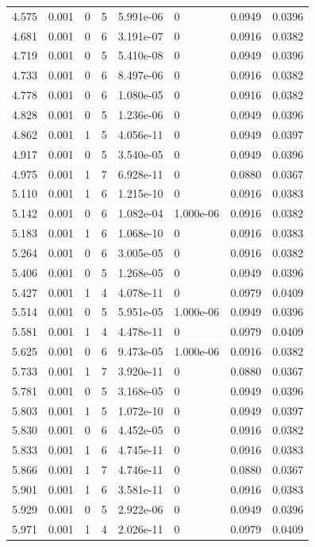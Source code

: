 \documentclass[preview]{standalone}
\begin{document}
{{{\begin{tabular}{L{1.2cm}C{1.2cm} C{0.3cm}C{0.5cm} C{1.4cm}C{1.4cm} C{1.4cm}C{1.4cm}}
  4.575  &  0.001  & 0     &  5 &  5.991e-06  & 0  & 0.0949 &  0.0396   \\ 
  4.681  &  0.001  & 0     &  6 &  3.191e-07  & 0  & 0.0916 &  0.0382   \\ 
  4.719  &  0.001  & 0     &  5 &  5.410e-08  & 0  & 0.0949 &  0.0396   \\ 
  4.733  &  0.001  & 0     &  6 &  8.497e-06  & 0  & 0.0916 &  0.0382   \\ 
  4.778  &  0.001  & 0     &  6 &  1.080e-05  & 0  & 0.0916 &  0.0382   \\ 
  4.828  &  0.001  & 0     &  5 &  1.236e-06  & 0  & 0.0949 &  0.0396   \\ 
  4.862  &  0.001  & 1     &  5 &  4.056e-11  & 0  & 0.0949 &  0.0397   \\ 
  4.917  &  0.001  & 0     &  5 &  3.540e-05  & 0  & 0.0949 &  0.0396   \\ 
  4.975  &  0.001  & 1     &  7 &  6.928e-11  & 0  & 0.0880 &  0.0367   \\ 
  5.110  &  0.001  & 1     &  6 &  1.215e-10  & 0  & 0.0916 &  0.0383   \\ 
  5.142  &  0.001  & 0     &  6 &  1.082e-04  & 1.000e-06  & 0.0916 &  0.0382   \\ 
  5.183  &  0.001  & 1     &  6 &  1.068e-10  & 0  & 0.0916 &  0.0383   \\ 
  5.264  &  0.001  & 0     &  6 &  3.005e-05  & 0  & 0.0916 &  0.0382   \\ 
  5.406  &  0.001  & 0     &  5 &  1.268e-05  & 0  & 0.0949 &  0.0396   \\ 
  5.427  &  0.001  & 1     &  4 &  4.078e-11  & 0  & 0.0979 &  0.0409   \\ 
  5.514  &  0.001  & 0     &  5 &  5.951e-05  & 1.000e-06  & 0.0949 &  0.0396   \\ 
  5.581  &  0.001  & 1     &  4 &  4.478e-11  & 0  & 0.0979 &  0.0409   \\ 
  5.625  &  0.001  & 0     &  6 &  9.473e-05  & 1.000e-06  & 0.0916 &  0.0382   \\ 
  5.733  &  0.001  & 1     &  7 &  3.920e-11  & 0  & 0.0880 &  0.0367   \\ 
  5.781  &  0.001  & 0     &  5 &  3.168e-05  & 0  & 0.0949 &  0.0396   \\ 
  5.803  &  0.001  & 1     &  5 &  1.072e-10  & 0  & 0.0949 &  0.0397   \\ 
  5.830  &  0.001  & 0     &  6 &  4.452e-05  & 0  & 0.0916 &  0.0382   \\ 
  5.833  &  0.001  & 1     &  6 &  4.745e-11  & 0  & 0.0916 &  0.0383   \\ 
  5.866  &  0.001  & 1     &  7 &  4.746e-11  & 0  & 0.0880 &  0.0367   \\ 
  5.901  &  0.001  & 1     &  6 &  3.581e-11  & 0  & 0.0916 &  0.0383   \\ 
  5.929  &  0.001  & 0     &  5 &  2.922e-06  & 0  & 0.0949 &  0.0396   \\ 
  5.971  &  0.001  & 1     &  4 &  2.026e-11  & 0  & 0.0979 &  0.0409   \\ 
\hline 
\end{tabular} 

}}}
\end{document}
